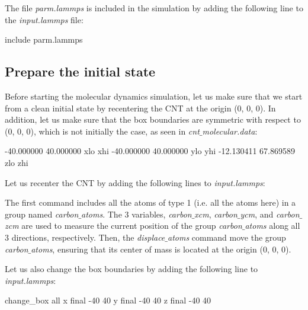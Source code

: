 \vspace{0.25cm} \noindent The file \textit{parm.lammps} is included in the
simulation by adding the following line to the \textit{input.lammps} file:

\begin{lcverbatim}
include parm.lammps
\end{lcverbatim}

\subsection{Prepare the initial state}
Before starting the molecular dynamics simulation,
let us make sure that we start from a clean initial state
by recentering the CNT at the origin (0, 0, 0). In addition, 
let us make sure that the box boundaries 
are symmetric with respect to (0, 0, 0), which is not initially the case,
as seen in \textit{cnt$\_$molecular.data}:

\begin{lcverbatim}
-40.000000 40.000000  xlo xhi
-40.000000 40.000000  ylo yhi
-12.130411 67.869589  zlo zhi
\end{lcverbatim}

\noindent Let us recenter the CNT by adding the following lines
to \textit{input.lammps}:


\noindent The first command includes all the atoms of type 1
(i.e. all the atoms here) in a group named \textit{carbon$\_$atoms}. 
The 3 variables, \textit{carbon$\_$xcm}, \textit{carbon$\_$ycm}, and \textit{carbon$\_$zcm} 
are used to measure
the current position of the group \textit{carbon$\_$atoms}
along all 3 directions, respectively. Then, the \textit{displace$\_$atoms} 
command move the group \textit{carbon$\_$atoms}, ensuring that its center of mass 
is located at the origin (0, 0, 0).

\vspace{0.25cm} \noindent Let us also change the box boundaries by adding the following line to \textit{input.lammps}:

\begin{lcverbatim}
change_box all x final -40 40 y final -40 40 z final -40 40
\end{lcverbatim}

